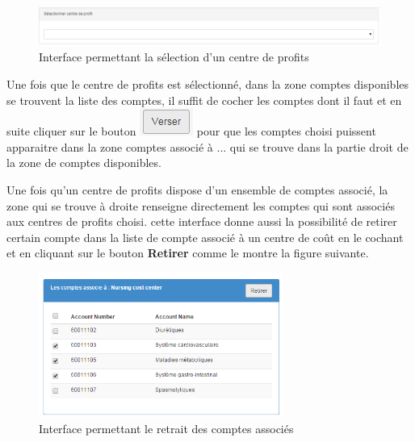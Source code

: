 \documentclass[12pt,a4paper]{report}
\begin{document}
\begin{figure}[h]
\begin{center}
\includegraphics[width=12cm]{pic/SelectCentreProfit.png}
\end{center}
\caption{Interface permettant la sélection d'un centre de profits}
\label{Interface permettant la sélection d'un centre de profits}
\end{figure} 

Une fois que le centre de profits est sélectionné, dans la zone comptes disponibles se trouvent la liste des comptes, il suffit de cocher les comptes dont il faut et en suite cliquer sur le bouton \includegraphics[scale=0.7]{pic/VerserCompte.png} pour que les comptes choisi puissent apparaitre dans la zone comptes associé à ... qui se trouve dans la partie droit de la zone de comptes disponibles.

Une fois qu'un centre de profits dispose d'un ensemble de comptes associé, la zone qui se trouve à droite renseigne directement les comptes qui sont associés aux centres de profits choisi. cette interface donne aussi la possibilité de retirer certain compte dans la liste de compte associé à un centre de coût en le cochant et en cliquant sur le bouton \textbf{Retirer} comme le montre la figure suivante.

\begin{figure}[h]
\begin{center}
\includegraphics[width=8cm]{pic/CompteAssocie.png}
\end{center}
\caption{Interface permettant le retrait des comptes associés}
\label{Interface permettant le retrait des comptes associés}
\end{figure}
\end{document}
